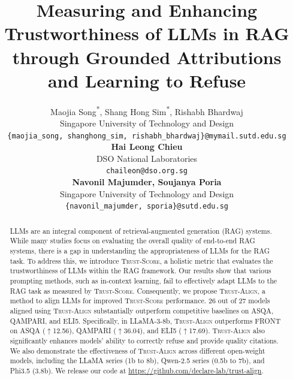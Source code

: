 \documentclass{article} %
\title{Measuring and Enhancing Trustworthiness of LLMs in RAG through Grounded Attributions and Learning to Refuse}
\author{%
    Maojia Song\textsuperscript{*}, Shang Hong Sim\textsuperscript{*}, Rishabh Bhardwaj\vphantom{\thanks{Equal contribution.}}\\
    Singapore University of Technology and Design \\
    \texttt{\small \{maojia\_song, shanghong\_sim, rishabh\_bhardwaj\}@mymail.sutd.edu.sg} \\
    \And
    \textbf{Hai Leong Chieu} \\
    DSO National Laboratories \\
    \texttt{\small chaileon@dso.org.sg} \\
    \And
    \textbf{Navonil Majumder, Soujanya Poria} \\
    Singapore University of Technology and Design \\
    \texttt{\small \{navonil\_majumder, sporia\}@sutd.edu.sg} 
}
\newcommand{\method}[0]{\textsc{Trust-Align}}
\newcommand{\metric}[0]{\textsc{Trust-Score}}
\begin{document}
\doparttoc %
\faketableofcontents %

\maketitle

\begin{abstract}
LLMs are an integral component of retrieval-augmented generation (RAG) systems. While many studies focus on evaluating the overall quality of end-to-end RAG systems, there is a gap in understanding the appropriateness of LLMs for the RAG task. To address this, we introduce \metric{}, a holistic metric that evaluates the trustworthiness of LLMs within the RAG framework. Our results show that various prompting methods, such as in-context learning, fail to effectively adapt LLMs to the RAG task as measured by \metric{}. Consequently, we propose \method{}, a method to align LLMs for improved \metric{} performance. 26 out of 27 models aligned using \method{} substantially outperform competitive baselines on ASQA, QAMPARI, and ELI5. Specifically, in LLaMA-3-8b, \method{} outperforms FRONT on ASQA (\(\uparrow\)12.56), QAMPARI (\(\uparrow\)36.04), and ELI5 (\(\uparrow\)17.69). \method{} also significantly enhances models' ability to correctly refuse and provide quality citations. We also demonstrate the effectiveness of \method{} across different open-weight models, including the LLaMA series (1b to 8b), Qwen-2.5 series (0.5b to 7b), and Phi3.5 (3.8b). We release our code at \url{https://github.com/declare-lab/trust-align}.


\end{abstract}
\end{document}
